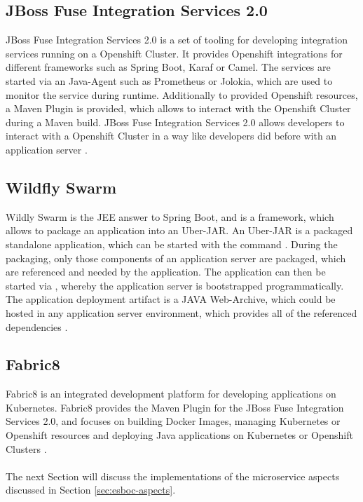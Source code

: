 \subsection{JBoss Fuse Integration Services 2.0}
\label{sec:esbi-technology-fis}
JBoss Fuse Integration Services 2.0 is a set of tooling for developing integration services running on a Openshift Cluster. It provides Openshift integrations for different frameworks such as Spring Boot, Karaf or Camel. The services are started via an Java-Agent such as Prometheus or Jolokia, which are used to monitor the service during runtime. Additionally to provided Openshift resources, a Maven Plugin is provided, which allows to interact with the Openshift Cluster during a Maven build. JBoss Fuse Integration Services 2.0 allows developers to interact with a Openshift Cluster in a way like developers did before with an application server \cite{Prometheus2018, Jolokia2018}.

\subsection{Wildfly Swarm}
\label{sec:esbi-technology-swarm}
Wildly Swarm is the JEE answer to Spring Boot, and is a framework, which allows to package an application into an Uber-JAR. An Uber-JAR is a packaged standalone application, which can be started with the command . During the packaging, only those components of an application server are packaged, which are referenced and needed by the application. The application can then be started via , whereby the application server is bootstrapped programmatically.  The application deployment artifact is a JAVA Web-Archive, which could be hosted in any application server environment, which provides all of the referenced dependencies \cite{WildflySwarm2018}. 

\subsection{Fabric8}
\label{sec:esbi-technology-f8}
Fabric8 is an integrated development platform for developing applications on Kubernetes. Fabric8 provides the Maven Plugin for the JBoss Fuse Integration Services 2.0, and focuses on building Docker Images, managing Kubernetes or Openshift resources and deploying Java applications on Kubernetes or Openshift Clusters \cite{Fabric82018}.
\\ \\
The next Section will discuss the implementations of the microservice aspects discussed in Section \vref{sec:esboc-aspects}.

